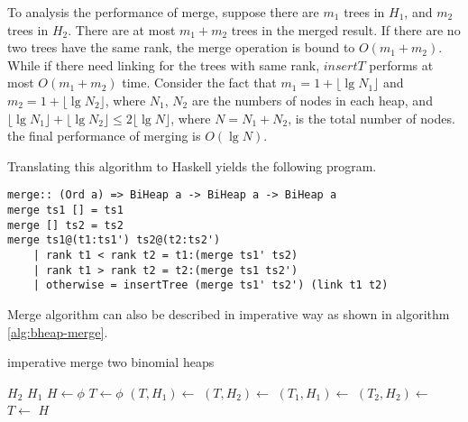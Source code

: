 \documentclass{article}
\begin{document}
To analysis the performance of merge, suppose there are $m_1$ trees in
$H_1$, and $m_2$ trees in $H_2$. There are at most $m_1 + m_2$ trees in 
the merged result. If there are no two trees have the same rank, the
merge operation is bound to $O(m_1 + m_2)$. While if there need linking
for the trees with same rank, $insertT$ performs at most $O(m_1+m_2)$
time. Consider the fact that $m_1 = 1 + \lfloor \lg N_1 \rfloor$ and 
$m_2 = 1 + \lfloor \lg N_2 \rfloor$, where
$N_1$, $N_2$ are the numbers of nodes in each heap, and 
$\lfloor \lg N_1 \rfloor + \lfloor \lg N_2 \rfloor \leq 2 \lfloor \lg N \rfloor$, where $N = N_1 + N_2$, is the total number of nodes. 
the final performance of merging is $O(\lg N)$.

Translating this algorithm to Haskell yields the following program.

\lstset{language=Haskell}
\begin{lstlisting}
merge:: (Ord a) => BiHeap a -> BiHeap a -> BiHeap a
merge ts1 [] = ts1
merge [] ts2 = ts2
merge ts1@(t1:ts1') ts2@(t2:ts2') 
    | rank t1 < rank t2 = t1:(merge ts1' ts2)
    | rank t1 > rank t2 = t2:(merge ts1 ts2')
    | otherwise = insertTree (merge ts1' ts2') (link t1 t2)
\end{lstlisting}

Merge algorithm can also be described in imperative way as shown
in algorithm \ref{alg:bheap-merge}.

\begin{algorithm}
\caption{imperative merge two binomial heaps}
\label{alg:bheap-merge}
\begin{algorithmic}
    \State \Return $H_2$
  \EndIf
    \State \Return $H_1$
  \EndIf
  \State $H \gets \phi$
    \State $T \gets \phi$
      \State $(T, H_1) \gets $ 
      \State $(T, H_2) \gets $ 
    \Else {}
      \State $(T_1, H_1) \gets $ 
      \State $(T_2, H_2) \gets $ 
      \State $T \gets $ 
    \EndIf
    \State {}
  \EndWhile
    \State {}
  \EndIf
    \State {}
  \EndIf
  \State \Return $H$
\EndFunction
\end{algorithmic}
\end{algorithm}
\end{document}
